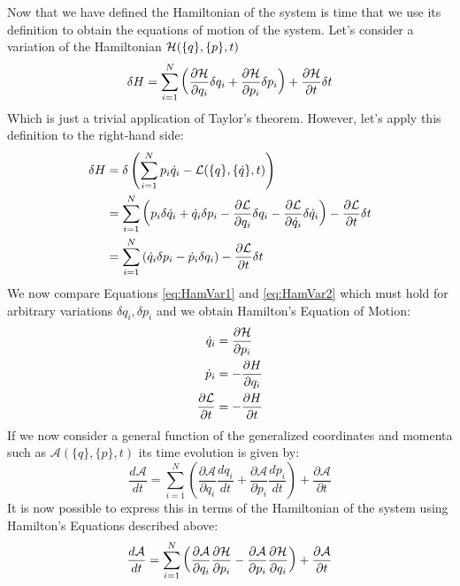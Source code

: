 \vspace{1mm}\noindent Now that we have defined the Hamiltonian of the system is time that we use its definition to obtain the equations of motion of the system. Let's consider a variation of the Hamiltonian $\mathcal{H}(\{q\},\{p\},t)$
\begin{equation}
    \delta H =\sum_{i=1}^N \left(\frac{\partial \mathcal{H}}{\partial q_i}\delta q_i + \frac{\partial \mathcal{H}}{\partial p_i}\delta p_i\right) + \frac{\partial \mathcal{H}}{\partial t}\delta t  
    \label{eq:HamVar1}
\end{equation}
Which is just a trivial application of Taylor's theorem. However, let's apply this definition to the right-hand side:
\begin{align}
     \delta H &= \delta\left( \sum_{i=1}^{N} p_i \dot q_i - \mathcal{L}(\{q\},\{\dot q\},t)\right)\\
     &= \sum_{i=1}^{N} \left( p_i \delta \dot q_i + \dot q_i \delta p_i - \frac{\partial\mathcal{L}}{\partial q_i}\delta q_i - \frac{\partial\mathcal{L}}{\partial \dot q_i} \delta \dot q_i\right) - \frac{\partial \mathcal{L}}{\partial t}\delta t\\
      &=\sum_{i=1}^{N} \left(  \dot q_i \delta p_i - \dot p_i \delta  q_i\right) - \frac{\partial \mathcal{L}}{\partial t}\delta t
      \label{eq:HamVar2}
\end{align}
We now compare Equations \ref{eq:HamVar1} and \ref{eq:HamVar2} which must hold for arbitrary variations $\delta q_i,\delta p_i$ and we obtain Hamilton's Equation of Motion:
\begin{align}
    \dot q_i &= \frac{\partial \mathcal{H}}{\partial p_i}\\
    \dot p_i &= -\frac{\partial H}{\partial q_i}\\
    \frac{\partial \mathcal{L}}{\partial t} &= -\frac{\partial H}{\partial t}
\end{align}
If we now consider a general function of the generalized coordinates and momenta such as $\mathcal{A}(\{q\},\{p\},t)$ its time evolution is given by:
\begin{equation}
     \frac{d\mathcal{A}}{dt} =\sum_{i=1}^N \left(\frac{\partial\mathcal{A}}{\partial q_i}\frac{dq_i}{d t}  +\frac{\partial\mathcal{A}}{\partial p_i}\frac{dp_i}{dt}\right) +\frac{\partial \mathcal{A}}{\partial t}
    \label{eq:TimeEvClassical}
\end{equation}
It is now possible to express this in terms of the Hamiltonian of the system using Hamilton's Equations described above:
\begin{equation}
    \frac{d\mathcal{A}}{dt} = \sum_{i=1}^N \left(\frac{\partial\mathcal{A}}{\partial q_i}\frac{\partial \mathcal{H}}{\partial p_i} - \frac{\partial\mathcal{A}}{\partial p_i}\frac{\partial \mathcal{H}}{\partial q_i}\right) +\frac{\partial \mathcal{A}}{\partial t}
\end{equation}
